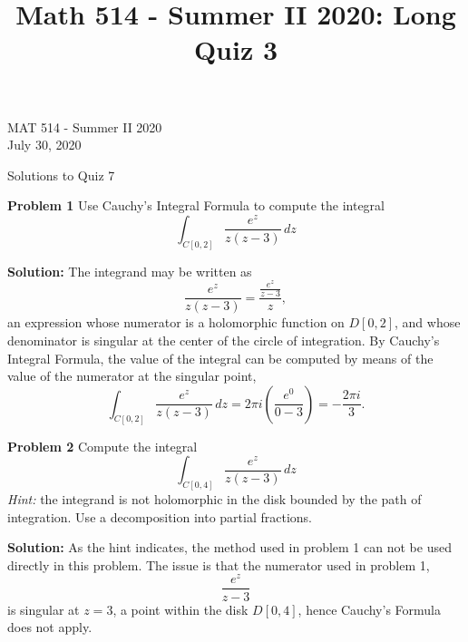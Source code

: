 \documentclass[12pt,oneside]{exam}
\title{Math 514 - Summer II 2020: Long Quiz 3}
\newenvironment{exercise}[1]{\vspace{.1in}\noindent\textbf{Problem #1 \hspace{.05em}}}{}
\begin{document}
\begin{flushright}
\sc MAT 514 - Summer II 2020\\
July 30, 2020
\end{flushright}
\bigskip
 
\begin{center}
\textsf{Solutions to Quiz 7} 
\end{center}

\begin{exercise}{1}
Use Cauchy's Integral Formula to compute the integral
\begin{equation*}
\int_{C[0,2]} \frac{e^z}{z(z-3)}\, dz
\end{equation*}
\end{exercise}

\vspace{0.5cm}

\noindent \textbf{Solution:} The integrand may be written as 
\begin{equation*}
 \frac{e^z}{z(z-3)} = \frac{\frac{e^z}{z-3}}{z}, 
 \end{equation*}
 an expression whose numerator is a holomorphic function on $D[0,2]$, and whose denominator is singular at the center of the circle of integration. By Cauchy's Integral Formula, the value of the integral can be computed by means of the value of the numerator at the singular point, 
 \begin{equation*}
\int_{C[0,2]} \frac{e^z}{z(z-3)}\, dz = 2\pi i \left(\frac{e^0}{0-3}\right) = -\frac{2\pi i}{3}.
\end{equation*}

\vspace{1cm}

\begin{exercise}{2}
Compute the integral 
\begin{equation*}
\int_{C[0,4]} \frac{e^z}{z(z-3)}\, dz
\end{equation*}
\emph{Hint:} the integrand is not holomorphic in the disk bounded by the path of integration. Use a decomposition into partial fractions.
\end{exercise}

\vspace{0.5cm}

\noindent \textbf{Solution:} As the hint indicates, the method used in problem 1 can not be used directly in this problem. The issue is that the numerator used in problem 1,
\begin{equation*}
\frac{e^z}{z-3}
\end{equation*}
is singular at $z=3$, a point within the disk $D[0,4]$, hence Cauchy's Formula does not apply. 
\end{document}
